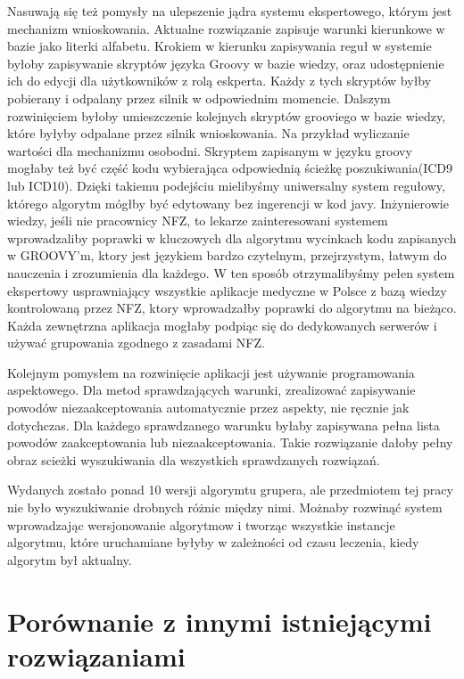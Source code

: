 Nasuwają się też pomysły na ulepszenie jądra systemu ekspertowego, którym jest mechanizm wnioskowania. Aktualne rozwiązanie zapisuje warunki kierunkowe w bazie jako literki alfabetu. Krokiem w kierunku zapisywania reguł w systemie byłoby zapisywanie skryptów języka Groovy w bazie wiedzy, oraz udostępnienie ich do edycji dla użytkowników z rolą eskperta. Każdy z tych skryptów byłby pobierany i odpalany przez silnik w odpowiednim momencie.
Dalszym rozwinięciem byłoby umieszczenie kolejnych skryptów grooviego w bazie wiedzy, które byłyby odpalane przez silnik wnioskowania. Na przykład wyliczanie wartości dla mechanizmu osobodni. Skryptem zapisanym w języku groovy mogłaby też być część kodu wybierająca odpowiednią ścieżkę poszukiwania(ICD9 lub ICD10). Dzięki takiemu podejściu mielibyśmy uniwersalny system regułowy, którego algorytm mógłby być edytowany bez ingerencji w kod javy. Inżynierowie wiedzy, jeśli nie pracownicy NFZ, to lekarze zainteresowani systemem wprowadzaliby poprawki w kluczowych dla algorytmu wycinkach kodu zapisanych w GROOVY'm, ktory jest językiem bardzo czytelnym, przejrzystym, łatwym do nauczenia i zrozumienia dla każdego. W ten sposób otrzymalibyśmy pełen system ekspertowy usprawniający wszystkie aplikacje medyczne w Polsce z bazą wiedzy kontrolowaną przez NFZ, ktory wprowadzałby poprawki do algorytmu na bieżąco. Każda zewnętrzna aplikacja mogłaby podpiąc się do dedykowanych serwerów i używać grupowania zgodnego z zasadami NFZ.

Kolejnym pomysłem na rozwinięcie aplikacji jest używanie programowania aspektowego. Dla metod sprawdzających warunki, zrealizować zapisywanie powodów niezaakceptowania automatycznie przez aspekty, nie ręcznie jak dotychczas. Dla każdego sprawdzanego warunku byłaby zapisywana pełna lista powodów zaakceptowania lub niezaakceptowania. Takie rozwiązanie dałoby pełny obraz scieżki wyszukiwania dla wszystkich sprawdzanych rozwiązań.

Wydanych zostało ponad 10 wersji algorymtu grupera, ale przedmiotem tej pracy nie było wyszukiwanie drobnych różnic między nimi. Możnaby rozwinąć system wprowadzając wersjonowanie algorytmow i tworząc wszystkie instancje algorytmu, które uruchamiane byłyby w zależności od czasu leczenia, kiedy algorytm był aktualny.



\section{Porównanie z innymi istniejącymi rozwiązaniami}
\label{sec:porownanieZinnymiRozwiazaniami}

